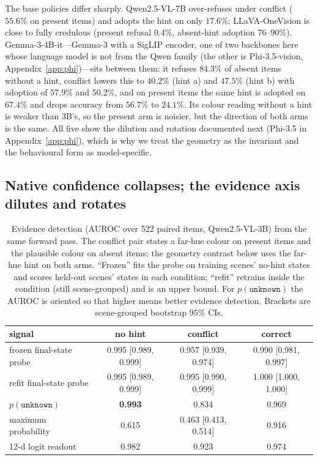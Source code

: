 \documentclass[10pt]{article}
\newcommand{\unknown}{\texttt{unknown}}
\newcommand{\punk}{p(\unknown)}
\begin{document}
The base policies differ sharply. Qwen2.5-VL-7B over-refuses under conflict ($55.6\%$ on present items) and adopts the hint on only $17.6\%$; LLaVA-OneVision is close to fully credulous (present refusal $0.4\%$, absent-hint adoption $76$--$90\%$). Gemma-3-4B-it---Gemma-3 with a SigLIP encoder, one of two backbones here whose language model is not from the Qwen family (the other is Phi-3.5-vision, Appendix~\ref{app:phi})---sits between them: it refuses $84.3\%$ of absent items without a hint, conflict lowers this to $40.2\%$ (hint a) and $47.5\%$ (hint b) with adoption of $57.9\%$ and $50.2\%$, and on present items the same hint is adopted on $67.4\%$ and drops accuracy from $56.7\%$ to $24.1\%$. Its colour reading without a hint is weaker than 3B's, so the present arm is noisier, but the direction of both arms is the same. All five show the dilution and rotation documented next (Phi-3.5 in Appendix~\ref{app:phi}), which is why we treat the geometry as the invariant and the behavioural form as model-specific.

\subsection{Native confidence collapses; the evidence axis dilutes and rotates}
\label{sec:signals}

\begin{table}[t]
\centering
\small
\setlength{\tabcolsep}{4pt}
\caption{Evidence detection (AUROC over 522 paired items, Qwen2.5-VL-3B) from the same forward pass. The conflict pair states a far-hue colour on present items and the plausible colour on absent items; the geometry contrast below uses the far-hue hint on both arms. ``Frozen'' fits the probe on training scenes' no-hint states and scores held-out scenes' states in each condition; ``refit'' retrains inside the condition (still scene-grouped) and is an upper bound. For $\punk$ the AUROC is oriented so that higher means better evidence detection. Brackets are scene-grouped bootstrap $95\%$ CIs.}
\label{tab:signals}
\begin{tabular}{lccc}
\toprule
signal & no hint & conflict & correct \\
\midrule
frozen final-state probe & 0.995 [0.989, 0.999] & 0.957 [0.939, 0.974] & 0.990 [0.981, 0.997] \\
refit final-state probe & 0.995 [0.989, 0.999] & 0.995 [0.990, 0.999] & 1.000 [1.000, 1.000] \\
$\punk$ & \textbf{0.993} & 0.834 & 0.969 \\
maximum probability & 0.615 & 0.463 [0.413, 0.514] & 0.916 \\
12-d logit readout & 0.982 & 0.923 & 0.974 \\
\bottomrule
\end{tabular}
\end{table}
\end{document}
